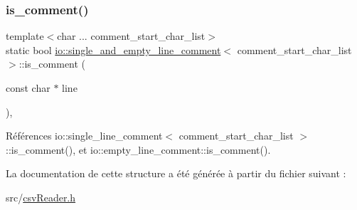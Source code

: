 \subsubsection{\texorpdfstring{is\+\_\+comment()}{is\_comment()}}
{\footnotesize\ttfamily template$<$char ... comment\+\_\+start\+\_\+char\+\_\+list$>$ \\
static bool \hyperlink{structio_1_1single__and__empty__line__comment}{io\+::single\+\_\+and\+\_\+empty\+\_\+line\+\_\+comment}$<$ comment\+\_\+start\+\_\+char\+\_\+list $>$\+::is\+\_\+comment (\begin{DoxyParamCaption}\item[{const char $\ast$}]{line }\end{DoxyParamCaption})\hspace{0.3cm}{\ttfamily [inline]}, {\ttfamily [static]}}



Références io\+::single\+\_\+line\+\_\+comment$<$ comment\+\_\+start\+\_\+char\+\_\+list $>$\+::is\+\_\+comment(), et io\+::empty\+\_\+line\+\_\+comment\+::is\+\_\+comment().



La documentation de cette structure a été générée à partir du fichier suivant \+:\begin{DoxyCompactItemize}
\item 
src/\hyperlink{csvReader_8h}{csv\+Reader.\+h}\end{DoxyCompactItemize}
